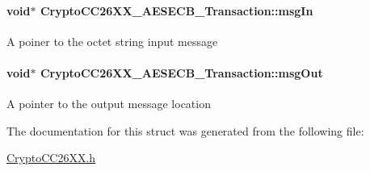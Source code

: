 \paragraph[{msg\-In}]{\setlength{\rightskip}{0pt plus 5cm}void$\ast$ Crypto\-C\-C26\-X\-X\-\_\-\-A\-E\-S\-E\-C\-B\-\_\-\-Transaction\-::msg\-In}\label{struct_crypto_c_c26_x_x___a_e_s_e_c_b___transaction_ac63701080bffd789b53c7effcf46cfe9}
A poiner to the octet string input message 
\paragraph[{msg\-Out}]{\setlength{\rightskip}{0pt plus 5cm}void$\ast$ Crypto\-C\-C26\-X\-X\-\_\-\-A\-E\-S\-E\-C\-B\-\_\-\-Transaction\-::msg\-Out}\label{struct_crypto_c_c26_x_x___a_e_s_e_c_b___transaction_ab5c3bff547308f1a63c771349cbef069}
A pointer to the output message location 

The documentation for this struct was generated from the following file\-:\begin{DoxyCompactItemize}
\item 
\hyperlink{_crypto_c_c26_x_x_8h}{Crypto\-C\-C26\-X\-X.\-h}\end{DoxyCompactItemize}
